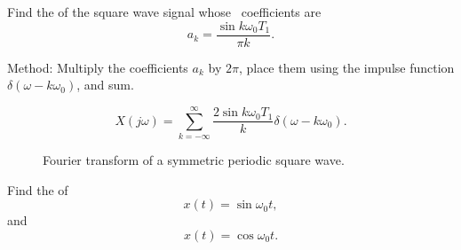 \begin{frame}[plain]
    \begin{example}
        Find the \ft of the square wave signal whose \fs~coefficients are
        \begin{equation*}
            a_k = \frac{\sin k \omega_0 T_1}{\pi k}.
        \end{equation*}
    \end{example}
\end{frame}


\begin{frame}[plain]
Method: Multiply the \fs coefficients $a_k$ by $2\pi$, place them using the impulse function $\delta(\omega - k\omega_0)$, and sum.



{
    \begin{equation*}
        X(j\omega) = \sum_{k=-\infty}^{\infty}\frac{2\sin k\omega_0 T_1}{k}\delta(\omega-k\omega_0).
    \end{equation*}
    \pause
    \begin{figure}
      \centering
      
      \caption{Fourier transform of a symmetric periodic square wave.}\label{fi:square_wave_ft}
    \end{figure}
}
\end{frame}



\begin{frame}[plain]
    \begin{example}
        Find the \ft of
            \begin{equation*}
                x(t) = \sin \omega_0 t,
            \end{equation*}
            and
            \begin{equation*}
                x(t) = \cos \omega_0 t.
            \end{equation*}
    \end{example}
\end{frame}


